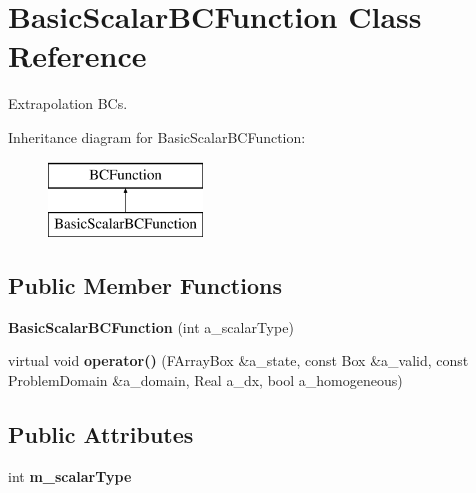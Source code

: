 \hypertarget{class_basic_scalar_b_c_function}{\section{Basic\-Scalar\-B\-C\-Function Class Reference}
\label{class_basic_scalar_b_c_function}
}


Extrapolation B\-Cs.  


Inheritance diagram for Basic\-Scalar\-B\-C\-Function\-:\begin{figure}[H]
\begin{center}
\leavevmode
\includegraphics[height=2.000000cm]{class_basic_scalar_b_c_function}
\end{center}
\end{figure}
\subsection*{Public Member Functions}
\begin{DoxyCompactItemize}
\item 
\hypertarget{class_basic_scalar_b_c_function_ad95c4ef4d45b60397846f0e6522138c2}{{\bfseries Basic\-Scalar\-B\-C\-Function} (int a\-\_\-scalar\-Type)}\label{class_basic_scalar_b_c_function_ad95c4ef4d45b60397846f0e6522138c2}

\item 
\hypertarget{class_basic_scalar_b_c_function_a45fa18015e1b7e523510d0c86d8e8155}{virtual void {\bfseries operator()} (F\-Array\-Box \&a\-\_\-state, const Box \&a\-\_\-valid, const Problem\-Domain \&a\-\_\-domain, Real a\-\_\-dx, bool a\-\_\-homogeneous)}\label{class_basic_scalar_b_c_function_a45fa18015e1b7e523510d0c86d8e8155}

\end{DoxyCompactItemize}
\subsection*{Public Attributes}
\begin{DoxyCompactItemize}
\item 
\hypertarget{class_basic_scalar_b_c_function_a2f6dd984c9de6277ccf9d64c1cfbb2bd}{int {\bfseries m\-\_\-scalar\-Type}}\label{class_basic_scalar_b_c_function_a2f6dd984c9de6277ccf9d64c1cfbb2bd}

\end{DoxyCompactItemize}


